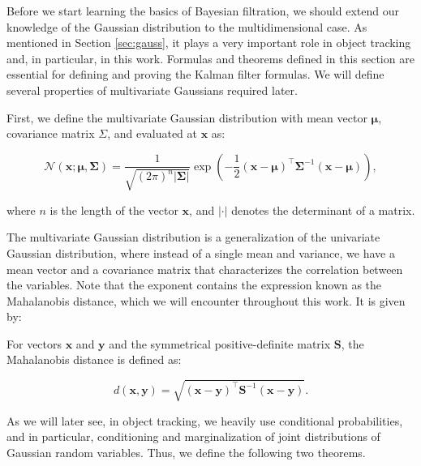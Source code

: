 Before we start learning the basics of Bayesian filtration, we should extend our knowledge of the Gaussian distribution to the multidimensional case. As mentioned in Section \ref{sec:gauss}, it plays a very important role in object tracking and, in particular, in this work. Formulas and theorems defined in this section are essential for defining and proving the Kalman filter formulas. We will define several properties of multivariate Gaussians required later.

First, we define the multivariate Gaussian distribution with mean vector $\boldsymbol\mu$, covariance matrix $\Sigma$, and evaluated at $\mathbf{x}$ as:

\begin{equation}\label{eq:vec-gauss-def}
    \mathscr{N}\left(\mathbf{x} ; \mathbf\mu, \mathbf\Sigma\right)
    = \frac{1}{\sqrt{(2\pi)^n|\mathbf{\Sigma}|}}\exp\left(-\frac{1}{2}(\mathbf{x}-\boldsymbol{\mu})^\top \mathbf{\Sigma}^{-1} (\mathbf{x}-\boldsymbol{\mu})\right),
\end{equation}

where $n$ is the length of the vector $\mathbf{x}$, and $|\cdot|$ denotes the determinant of a matrix. 

The multivariate Gaussian distribution is a generalization of the univariate Gaussian distribution, where instead of a single mean and variance, we have a mean vector and a covariance matrix that characterizes the correlation between the variables. Note that the exponent contains the expression known as the Mahalanobis distance, which we will encounter throughout this work. It is given by:

\begin{definition}\label{def:mahalanobis}
    For vectors $\mathbf x$ and $\mathbf y$ and the symmetrical positive-definite matrix $\mathbf S$, the Mahalanobis distance is defined as:

    \begin{equation}
        d(\mathbf x, \mathbf y) 
        = \sqrt{
            (\mathbf x - \mathbf y)^\intercal
            \mathbf{S}^{-1}
            (\mathbf x - \mathbf y)
        }.
    \end{equation}
\end{definition}

As we will later see, in object tracking, we heavily use conditional probabilities, and in particular, conditioning and marginalization of joint distributions of Gaussian random variables. Thus, we define the following two theorems.

